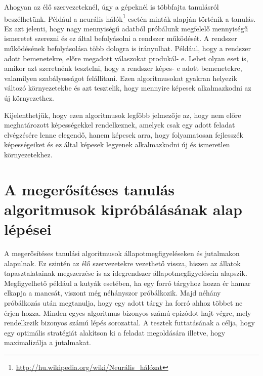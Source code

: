 Ahogyan az élő szervezeteknél, úgy a gépeknél is többfajta tanulásról beszélhetünk. Például a neurális hálók\footnote{\href {http://hu.wikipedia.org/wiki/Neurális\_hálózat}{http://hu.wikipedia.org/wiki/Neurális\_hálózat}} esetén minták alapján történik a tanulás. Ez azt jelenti, hogy nagy mennyiségű adatból próbálunk megfelelő mennyiségű ismeretet szerezni és ez által befolyásolni a rendszer működését. A rendszer működésének befolyásolása több dologra is irányulhat. Például, hogy a rendszer adott bemenetekre, előre megadott válaszokat produkál- e. Lehet olyan eset is, amikor azt szeretnénk tesztelni, hogy a rendszer képes- e adott bemenetekre, valamilyen szabályosságot felállítani. Ezen algoritmusokat gyakran helyezik változó környezetekbe és azt tesztelik, hogy mennyire képesek alkalmazkodni az új környezethez. 

Kijelenthetjük, hogy ezen algoritmusok legfőbb jelmezője az, hogy nem előre meghatározott képességekkel rendelkeznek, amelyek csak egy adott feladat elvégzésére lenne elegendő, hanem képesek arra, hogy folyamatosan fejlesszék képességeiket és ez által képesek legyenek alkalmazkodni új és ismeretlen környezetekhez.

\section{A megerősítéses tanulás algoritmusok kipróbálásának alap lépései}\label{sec:MEGEROSITESESALOGRITMUSOK}

A megerősítéses tanulási algoritmusok állapotmegfigyeléseken és jutalmakon alapulnak. Ez szintén az élő szervezetekre vezethető vissza, hiszen az állatok tapasztalatainak megszerzése is az idegrendszer állapotmegfigyelésein alapszik. Megfigyelhető például a kutyák esetében, ha egy forró tárgyhoz hozza ér hamar elkapja a mancsát, viszont még néhányszor próbálkozik. Majd néhány próbálkozás után megtanulja, hogy egy adott tárgy ha forró ahhoz többet ne érjen hozza. 
Minden egyes algoritmus bizonyos számú epizódot hajt végre, mely rendelkezik bizonyos számú lépés sorozattal. A tesztek futtatásának a célja, hogy egy optimális stratégiát alakítson ki a feladat megoldására illetve, hogy maximalizálja a jutalmakat.

